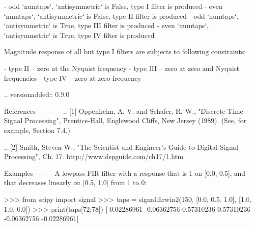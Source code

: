 \begin{DoxyVerb}
   - odd  `numtaps`, `antisymmetric` is False, type I filter is produced
   - even `numtaps`, `antisymmetric` is False, type II filter is produced
   - odd  `numtaps`, `antisymmetric` is True, type III filter is produced
   - even `numtaps`, `antisymmetric` is True, type IV filter is produced

Magnitude response of all but type I filters are subjects to following
constraints:

   - type II  -- zero at the Nyquist frequency
   - type III -- zero at zero and Nyquist frequencies
   - type IV  -- zero at zero frequency

.. versionadded:: 0.9.0

References
----------
.. [1] Oppenheim, A. V. and Schafer, R. W., "Discrete-Time Signal
   Processing", Prentice-Hall, Englewood Cliffs, New Jersey (1989).
   (See, for example, Section 7.4.)

.. [2] Smith, Steven W., "The Scientist and Engineer's Guide to Digital
   Signal Processing", Ch. 17. http://www.dspguide.com/ch17/1.htm

Examples
--------
A lowpass FIR filter with a response that is 1 on [0.0, 0.5], and
that decreases linearly on [0.5, 1.0] from 1 to 0:

>>> from scipy import signal
>>> taps = signal.firwin2(150, [0.0, 0.5, 1.0], [1.0, 1.0, 0.0])
>>> print(taps[72:78])
[-0.02286961 -0.06362756  0.57310236  0.57310236 -0.06362756 -0.02286961]\end{DoxyVerb}
 \hypertarget{namespacescipy_1_1signal_1_1fir__filter__design_a82a81e6f5d1b0c6ca6b1eebc0f111cc5}{}
